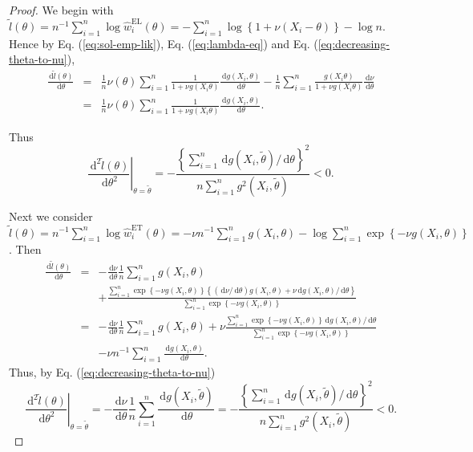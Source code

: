 \documentclass[oneside,english]{amsbook}
\numberwithin{section}{chapter}
\numberwithin{equation}{section}
\numberwithin{figure}{section}
\theoremstyle{plain}
\theoremstyle{plain}
\theoremstyle{definition}
\theoremstyle{plain}
\theoremstyle{plain}
\theoremstyle{remark}
\theoremstyle{definition}
\theoremstyle{definition}
\newcommand{\diff}{\,\mathrm{d}}
\begin{document}
\begin{proof}
We begin with $\tilde{l}\left(\theta\right)=n^{-1}\sum_{i=1}^{n}\log\hat{w}_{i}^{\mathrm{EL}}\left(\theta\right)=-\sum_{i=1}^{n}\log\left\{ 1+\nu\left(X_{i}-\theta\right)\right\} -\log n$.
Hence by Eq. (\ref{eq:sol-emp-lik}), Eq. (\ref{eq:lambda-eq}) and Eq. (\ref{eq:decreasing-theta-to-nu}),
\begin{eqnarray*}
\frac{\diff\tilde{l}\left(\theta\right)}{\diff\theta}&=&\frac{1}{n}\nu\left(\theta\right)\sum_{i=1}^{n}\frac{1}{1+\nu g\left(X_{i}\theta\right)}\frac{\diff g\left(X_{i},\theta\right)}{\diff\theta}-\frac{1}{n}\sum_{i=1}^{n}\frac{g\left(X_{i}\theta\right)}{1+\nu g\left(X_{i}\theta\right)}\frac{\diff\nu}{\diff\theta}\\
&=&\frac{1}{n}\nu\left(\theta\right)\sum_{i=1}^{n}\frac{1}{1+\nu g\left(X_{i}\theta\right)}\frac{\diff g\left(X_{i},\theta\right)}{\diff\theta}.
\end{eqnarray*}


Thus 
\[
\left.\frac{\diff^{2}\tilde{l}\left(\theta\right)}{\diff\theta^{2}}\right|_{\theta=\tilde{\theta}}=-\frac{\left\{ \sum_{i=1}^{n}\diff g\left(X_{i},\tilde{\theta}\right)/\diff\theta\right\} ^{2}}{n\sum_{i=1}^{n}g^{2}\left(X_{i},\tilde{\theta}\right)}<0.
\]


Next we consider $\tilde{l}\left(\theta\right)=n^{-1}\sum_{i=1}^{n}\log\hat{w}_{i}^{\mathrm{ET}}\left(\theta\right)=-\nu n^{-1}\sum_{i=1}^{n}g\left(X_{i},\theta\right)-\log\sum_{i=1}^{n}\exp\left\{ -\nu g\left(X_{i},\theta\right)\right\} $.
Then 
\begin{eqnarray*}
\frac{\diff\tilde{l}\left(\theta\right)}{\diff\theta} & = & -\frac{\diff\nu}{\diff\theta}\frac{1}{n}\sum_{i=1}^{n}g\left(X_{i},\theta\right)\\
 &  & +\frac{\sum_{i=1}^{n}\exp\left\{ -\nu g\left(X_{i},\theta\right)\right\} \left\{ \left(\diff\nu/\diff\theta\right) g\left(X_{i},\theta\right)+\nu\diff g\left(X_{i},\theta\right)/\diff\theta\right\} }{\sum_{i=1}^{n}\exp\left\{ -\nu g\left(X_{i},\theta\right)\right\} }\\
 & = & -\frac{\diff\nu}{\diff\theta}\frac{1}{n}\sum_{i=1}^{n}g\left(X_{i},\theta\right)+\nu\frac{\sum_{i=1}^{n}\exp\left\{ -\nu g\left(X_{i},\theta\right)\right\} \diff g\left(X_{i},\theta\right)/\diff\theta}{\sum_{i=1}^{n}\exp\left\{ -\nu g\left(X_{i},\theta\right)\right\} }\\
 &  & -\nu n^{-1}\sum_{i=1}^{n}\frac{\diff g\left(X_{i},\theta\right)}{\diff\theta}.
\end{eqnarray*}
Thus, by Eq. (\ref{eq:decreasing-theta-to-nu})
\[
\left.\frac{\diff^{2}\tilde{l}\left(\theta\right)}{\diff\theta^{2}}\right|_{\theta=\tilde{\theta}}=-\frac{\diff\nu}{\diff\theta}\frac{1}{n}\sum_{i=1}^{n}\frac{\diff g\left(X_{i},\tilde{\theta}\right)}{\diff\theta}=-\frac{\left\{ \sum_{i=1}^{n}\diff g\left(X_{i},\tilde{\theta}\right)/\diff\theta\right\} ^{2}}{n\sum_{i=1}^{n}g^{2}\left(X_{i},\tilde{\theta}\right)}<0.
\]



\end{proof}
\end{document}
